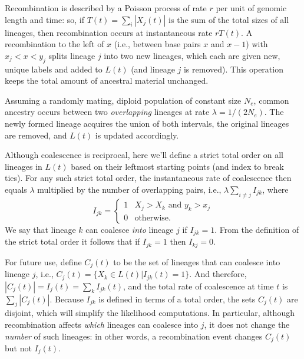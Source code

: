 \documentclass{article}
\begin{document}
Recombination is described by a Poisson process of rate $r$ per unit of genomic length and time:
so, if $T(t) = \sum_i |X_j(t)|$ is the sum of the total sizes of all lineages,
then recombination occurs at instantaneous rate $rT(t)$.
A recombination to the left of $x$
(i.e., between base pairs $x$ and $x-1$)
with $x_{j} < x <y_{j}$ splits lineage $j$ into two new lineages,
which each are given new, unique labels and added to $L(t)$
(and lineage $j$ is removed).
This operation keeps the total amount of ancestral material unchanged.

Assuming a randomly mating, diploid population of constant size $N_e$,
common ancestry occurs between
two \emph{overlapping} lineages at rate $\lambda = 1/(2N_e)$.
The newly formed lineage acquires the union of both intervals,
the original lineages are removed, and $L(t)$ is updated accordingly.

Although coalescence is reciprocal, here we'll define a strict total order
on all lineages in $L(t)$ based on their leftmost starting points (and index to break ties).
For any such strict total order,
the instantaneous rate of coalescence then equals $\lambda$ multiplied by the number of overlapping pairs,
i.e., $\lambda \sum_{i \neq j} I_{jk}$,
where
\begin{equation} \label{def:coal}
I_{jk} = \begin{cases}
    1 & X_j > X_k \text{ and } y_k > x_j \\
    0 & \text{otherwise.}
\end{cases}
\end{equation}
We say that lineage $k$ can coalesce \emph{into} lineage $j$ if $I_{jk} = 1$. From the
definition of the strict total order it follows that
if $I_{jk} = 1$ then $I_{kj} = 0$.

For future use, define $C_j(t)$ to be the set of lineages that can coalesce into lineage $j$,
i.e., $C_j(t) = \{X_k \in L(t) | I_{jk}(t) = 1\}$. And therefore, 
$|C_j(t)| = I_{j}(t) = \sum_{k} I_{jk}(t)$,
and the total rate of coalescence at time $t$ is $\sum_{j} |C_j(t)|$.
Because $I_{jk}$ is defined in terms of a total order, the sets $C_j(t)$ are disjoint,
which will simplify the likelihood computations.
In particular,
although recombination affects \emph{which} lineages can coalesce into $j$,
it does not change the \emph{number} of such lineages:
in other words, a recombination event changes $C_j(t)$ but not $I_{j}(t)$.

\end{document}
